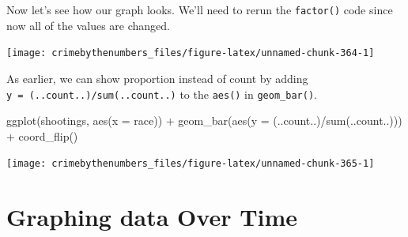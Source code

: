 \documentclass[
]{krantz}
\makeatletter
\newenvironment{Shaded}{\begin{snugshade}}{\end{snugshade}}
\newcommand{\AttributeTok}[1]{\textcolor[rgb]{0.61,0.61,0.61}{#1}}
\newcommand{\ConstantTok}[1]{\textcolor[rgb]{0,0,0}{#1}}
\newcommand{\FunctionTok}[1]{\textcolor[rgb]{0,0,0}{#1}}
\newcommand{\NormalTok}[1]{#1}
\newcommand{\OtherTok}[1]{\textcolor[rgb]{0.37,0.37,0.37}{#1}}
\newcommand{\SpecialCharTok}[1]{\textcolor[rgb]{0,0,0}{#1}}
\newenvironment{kframe}{%
\medskip{}
\setlength{\fboxsep}{.8em}
 \def\at@end@of@kframe{}%
 \ifinner\ifhmode%
  \def\at@end@of@kframe{\end{minipage}}%
  \begin{minipage}{\columnwidth}%
 \fi\fi%
 \def\FrameCommand##1{\hskip\@totalleftmargin \hskip-\fboxsep
 \colorbox{shadecolor}{##1}\hskip-\fboxsep
     \hskip-\linewidth \hskip-\@totalleftmargin \hskip\columnwidth}%
 \MakeFramed {\advance\hsize-\width
   \@totalleftmargin\z@ \linewidth\hsize
   \@setminipage}}%
 {\par\unskip\endMakeFramed%
 \at@end@of@kframe}
\renewenvironment{Shaded}{\begin{kframe}}{\end{kframe}}
\makeatother
\begin{document}
Now let's see how our graph looks. We'll need to rerun the \texttt{factor()} code since now all of the values are changed.

\begin{Shaded}
\end{Shaded}

\begin{center}\texttt{[image: crimebythenumbers\_files/figure-latex/unnamed-chunk-364-1]} \end{center}

As earlier, we can show proportion instead of count by adding \texttt{y\ =\ (..count..)/sum(..count..)} to the \texttt{aes()} in \texttt{geom\_bar()}.

\begin{Shaded}
\begin{Highlighting}[]
\FunctionTok{ggplot}\NormalTok{(shootings, }\FunctionTok{aes}\NormalTok{(}\AttributeTok{x =}\NormalTok{ race)) }\SpecialCharTok{+} 
  \FunctionTok{geom\_bar}\NormalTok{(}\FunctionTok{aes}\NormalTok{(}\AttributeTok{y =}\NormalTok{ (..count..)}\SpecialCharTok{/}\FunctionTok{sum}\NormalTok{(..count..))) }\SpecialCharTok{+}
  \FunctionTok{coord\_flip}\NormalTok{() }
\end{Highlighting}
\end{Shaded}

\begin{center}\texttt{[image: crimebythenumbers\_files/figure-latex/unnamed-chunk-365-1]} \end{center}

\hypertarget{graphing-data-over-time}{%
\section{Graphing data Over Time}\label{graphing-data-over-time}}
\end{document}
